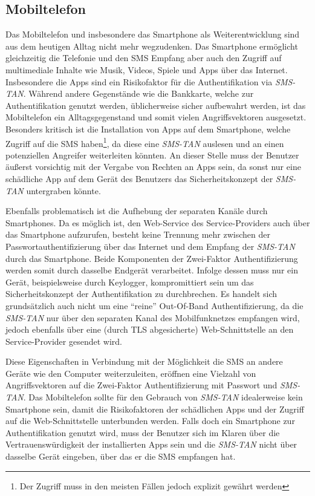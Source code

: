 \documentclass[11pt,a4paper,ngerman]{scrreprt}
\begin{document}
\subsection{Mobiltelefon}
Das Mobiltelefon und insbesondere das Smartphone als Weiterentwicklung sind aus dem heutigen Alltag nicht mehr wegzudenken. Das Smartphone ermöglicht gleichzeitig die Telefonie und den SMS Empfang aber auch den Zugriff auf multimediale Inhalte wie Musik, Videos, Spiele und Apps über das Internet. Insbesondere die Apps sind ein Risikofaktor für die Authentifikation via \textit{SMS-TAN}. Während andere Gegenstände wie die Bankkarte, welche zur Authentifikation genutzt werden, üblicherweise sicher aufbewahrt werden, ist das Mobiltelefon ein Alltagsgegenstand und somit vielen Angriffsvektoren ausgesetzt. Besonders kritisch ist die Installation von Apps auf dem Smartphone, welche Zugriff auf die SMS haben\footnote{Der Zugriff muss in den meisten Fällen jedoch explizit gewährt werden}, da diese eine \textit{SMS-TAN} auslesen und an einen potenziellen Angreifer weiterleiten könnten. An dieser Stelle muss der Benutzer äußerst vorsichtig mit der Vergabe von Rechten an Apps sein, da sonst nur eine schädliche App auf dem Gerät des Benutzers das Sicherheitskonzept der \textit{SMS-TAN} untergraben könnte.

Ebenfalls problematisch ist die Aufhebung der separaten Kanäle durch Smartphones. Da es möglich ist, den Web-Service des Service-Providers auch über das Smartphone aufzurufen, besteht keine Trennung mehr zwischen der Passwortauthentifizierung über das Internet und dem Empfang der \textit{SMS-TAN} durch das Smartphone. Beide Komponenten der Zwei-Faktor Authentifizierung werden somit durch dasselbe Endgerät verarbeitet. Infolge dessen muss nur ein Gerät, beispielsweise durch Keylogger, kompromittiert sein um das Sicherheitskonzept der Authentifikation zu durchbrechen. Es handelt sich grundsätzlich auch nicht um eine ``reine'' Out-Of-Band Authentifizierung, da die \textit{SMS-TAN} nur über den separaten Kanal des Mobilfunknetzes empfangen wird, jedoch ebenfalls über eine (durch TLS abgesicherte) Web-Schnittstelle an den Service-Provider gesendet wird.

Diese Eigenschaften in Verbindung mit der Möglichkeit die SMS an andere Geräte wie den Computer weiterzuleiten, eröffnen eine Vielzahl von Angriffsvektoren auf die Zwei-Faktor Authentifizierung mit Passwort und \textit{SMS-TAN}. Das Mobiltelefon sollte für den Gebrauch von \textit{SMS-TAN} idealerweise kein Smartphone sein, damit die Risikofaktoren der schädlichen Apps und der Zugriff auf die Web-Schnittstelle unterbunden werden. Falls doch ein Smartphone zur Authentifikation genutzt wird, muss der Benutzer sich im Klaren über die Vertrauenswürdigkeit der installierten Apps sein und die \textit{SMS-TAN} nicht über dasselbe Gerät eingeben, über das er die SMS empfangen hat.
\end{document}
